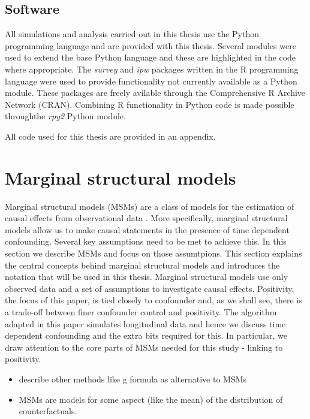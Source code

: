 \documentclass[11pt]{article}
\providecommand{\tightlist}{%
      \setlength{\itemsep}{0pt}\setlength{\parskip}{0pt}}
\begin{document}
    \subsection{Software}\label{software}

All simulations and analysis carried out in this thesis use the Python
programming language and are provided with this thesis. Several modules
were used to extend the base Python language and these are highlighted
in the code where appropriate. The \emph{survey} and \emph{ipw} packages
written in the R programming language were used to provide functionality
not currently available as a Python module. These packages are freely
avilable through the Comprehensive R Archive Network (CRAN). Combining R
functionality in Python code is made possible throughthe \emph{rpy2}
Python module. \linebreak

All code used for this thesis are provided in an appendix.

    \newpage

    \section{Marginal structural models}\label{marginal-structural-models}

Marginal structural models (MSMs) are a class of models for the
estimation of causal effects from observational data \citet{Robins2000}.
More specifically, marginal structural models allow us to make causal
statements in the presence of time dependent confounding. Several key
assumptions need to be met to achieve this. In this section we describe
MSMs and focus on those assumtpions. This section explains the central
concepts behind marginal structural models and introduces the notation
that will be used in this thesis. Marginal structural models use only
observed data and a set of assumptions to investigate causal effects.
Positivity, the focus of this paper, is tied closely to confounder and,
as we shall see, there is a trade-off between finer confounder control
and positivity. The algorithm adapted in this paper simulates
longitudinal data and hence we discuss time dependent confounding and
the extra bits required for this. In particular, we draw attention to
the core parts of MSMs needed for this study - linking to positivity.

\begin{itemize}
\tightlist
\item
  describe other methods like g formula as alternative to MSMs
\item
  MSMs are models for some aspect (like the mean) of the distribution of
  counterfactuals.
\end{itemize}
\end{document}
